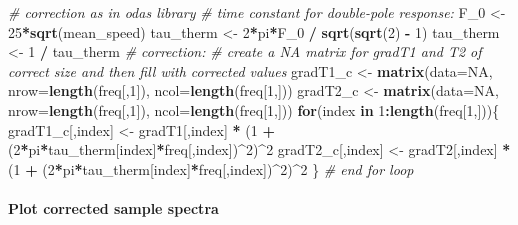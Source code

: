 \documentclass[]{article}
\newenvironment{Shaded}{\begin{snugshade}}{\end{snugshade}}
\newcommand{\KeywordTok}[1]{\textcolor[rgb]{0.13,0.29,0.53}{\textbf{#1}}}
\newcommand{\DataTypeTok}[1]{\textcolor[rgb]{0.13,0.29,0.53}{#1}}
\newcommand{\DecValTok}[1]{\textcolor[rgb]{0.00,0.00,0.81}{#1}}
\newcommand{\StringTok}[1]{\textcolor[rgb]{0.31,0.60,0.02}{#1}}
\newcommand{\CommentTok}[1]{\textcolor[rgb]{0.56,0.35,0.01}{\textit{#1}}}
\newcommand{\OtherTok}[1]{\textcolor[rgb]{0.56,0.35,0.01}{#1}}
\newcommand{\ControlFlowTok}[1]{\textcolor[rgb]{0.13,0.29,0.53}{\textbf{#1}}}
\newcommand{\OperatorTok}[1]{\textcolor[rgb]{0.81,0.36,0.00}{\textbf{#1}}}
\newcommand{\NormalTok}[1]{#1}
\let\oldparagraph\paragraph
\renewcommand{\paragraph}[1]{\oldparagraph{#1}\mbox{}}
\begin{document}
\begin{Shaded}
\begin{Highlighting}[]
\CommentTok{# correction as in odas library}
\CommentTok{# time constant for double-pole response:}
\NormalTok{F_}\DecValTok{0}\NormalTok{ <-}\StringTok{ }\DecValTok{25}\OperatorTok{*}\KeywordTok{sqrt}\NormalTok{(mean_speed)}
\NormalTok{tau_therm <-}\StringTok{ }\DecValTok{2}\OperatorTok{*}\NormalTok{pi}\OperatorTok{*}\NormalTok{F_}\DecValTok{0} \OperatorTok{/}\StringTok{ }\KeywordTok{sqrt}\NormalTok{(}\KeywordTok{sqrt}\NormalTok{(}\DecValTok{2}\NormalTok{) }\OperatorTok{-}\StringTok{ }\DecValTok{1}\NormalTok{)   }
\NormalTok{tau_therm <-}\StringTok{ }\DecValTok{1} \OperatorTok{/}\StringTok{ }\NormalTok{tau_therm}
\CommentTok{# correction:}
\CommentTok{# create a NA matrix for gradT1 and T2 of correct size and then fill with corrected values}
\NormalTok{gradT1_c <-}\StringTok{ }\KeywordTok{matrix}\NormalTok{(}\DataTypeTok{data=}\OtherTok{NA}\NormalTok{, }\DataTypeTok{nrow=}\KeywordTok{length}\NormalTok{(freq[,}\DecValTok{1}\NormalTok{]), }\DataTypeTok{ncol=}\KeywordTok{length}\NormalTok{(freq[}\DecValTok{1}\NormalTok{,]))}
\NormalTok{gradT2_c <-}\StringTok{ }\KeywordTok{matrix}\NormalTok{(}\DataTypeTok{data=}\OtherTok{NA}\NormalTok{, }\DataTypeTok{nrow=}\KeywordTok{length}\NormalTok{(freq[,}\DecValTok{1}\NormalTok{]), }\DataTypeTok{ncol=}\KeywordTok{length}\NormalTok{(freq[}\DecValTok{1}\NormalTok{,]))}
\ControlFlowTok{for}\NormalTok{(index }\ControlFlowTok{in} \DecValTok{1}\OperatorTok{:}\KeywordTok{length}\NormalTok{(freq[}\DecValTok{1}\NormalTok{,]))\{}
\NormalTok{  gradT1_c[,index] <-}\StringTok{ }\NormalTok{gradT1[,index] }\OperatorTok{*}\StringTok{ }\NormalTok{(}\DecValTok{1} \OperatorTok{+}\StringTok{ }\NormalTok{(}\DecValTok{2}\OperatorTok{*}\NormalTok{pi}\OperatorTok{*}\NormalTok{tau_therm[index]}\OperatorTok{*}\NormalTok{freq[,index])}\OperatorTok{^}\DecValTok{2}\NormalTok{)}\OperatorTok{^}\DecValTok{2}
\NormalTok{  gradT2_c[,index] <-}\StringTok{ }\NormalTok{gradT2[,index] }\OperatorTok{*}\StringTok{ }\NormalTok{(}\DecValTok{1} \OperatorTok{+}\StringTok{ }\NormalTok{(}\DecValTok{2}\OperatorTok{*}\NormalTok{pi}\OperatorTok{*}\NormalTok{tau_therm[index]}\OperatorTok{*}\NormalTok{freq[,index])}\OperatorTok{^}\DecValTok{2}\NormalTok{)}\OperatorTok{^}\DecValTok{2}
\NormalTok{\} }\CommentTok{# end for loop}
\end{Highlighting}
\end{Shaded}

\paragraph{Plot corrected sample
spectra}\label{plot-corrected-sample-spectra}
\end{document}
